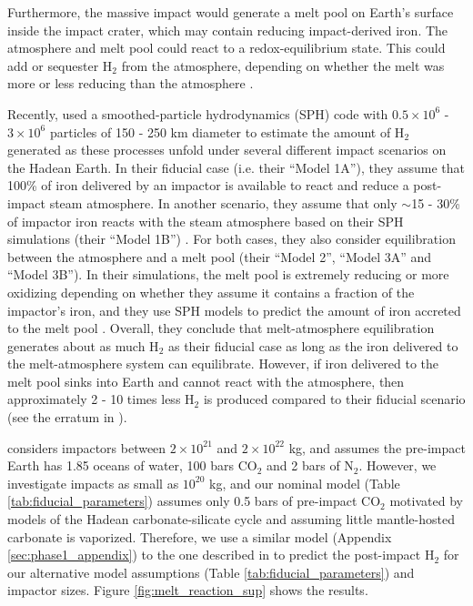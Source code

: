 Furthermore, the massive impact would generate a melt pool on Earth's surface inside the impact crater, which may contain reducing impact-derived iron. The atmosphere and melt pool could react to a redox-equilibrium state. This could add or sequester H$_2$ from the atmosphere, depending on whether the melt was more or less reducing than the atmosphere \citep{Itcovitz_2022}.

Recently, \citet{Itcovitz_2022} used a smoothed-particle hydrodynamics (SPH) code with $0.5 \times 10^6$ - $3 \times 10^6$ particles of 150 - 250 km diameter to estimate the amount of H$_2$ generated as these processes unfold under several different impact scenarios on the Hadean Earth. In their fiducial case (i.e. their ``Model 1A''), they assume that 100\% of iron delivered by an impactor is available to react and reduce a post-impact steam atmosphere. In another scenario, they assume that only $\sim$15 - 30\% of impactor iron reacts with the steam atmosphere based on their SPH simulations (their ``Model 1B'') \citep{Citron_2022}. For both cases, they also consider equilibration between the atmosphere and a melt pool (their ``Model 2'', ``Model 3A'' and ``Model 3B''). In their simulations, the melt pool is extremely reducing or more oxidizing depending on whether they assume it contains a fraction of the impactor's iron, and they use SPH models to predict the amount of iron accreted to the melt pool \citep{Citron_2022}. Overall, they conclude that melt-atmosphere equilibration generates about as much H$_2$ as their fiducial case as long as the iron delivered to the melt-atmosphere system can equilibrate. However, if iron delivered to the melt pool sinks into Earth and cannot react with the atmosphere, then approximately 2 - 10 times less H$_2$ is produced compared to their fiducial scenario (see the erratum in \citet{Itcovitz_2022}).

\citet{Itcovitz_2022} considers impactors between $2 \times 10^{21}$ and $2 \times 10^{22}$ kg, and assumes the pre-impact Earth has 1.85 oceans of water, 100 bars CO$_2$ and 2 bars of N$_2$. However, we investigate impacts as small as $10^{20}$ kg, and our nominal model (Table \ref{tab:fiducial_parameters}) assumes only 0.5 bars of pre-impact CO$_2$ motivated by models of the Hadean carbonate-silicate cycle \citep{Kadoya_2020} and assuming little mantle-hosted carbonate is vaporized. Therefore, we use a similar model (Appendix \ref{sec:phase1_appendix}) to the one described in \citet{Itcovitz_2022} to predict the post-impact H$_2$ for our alternative model assumptions (Table \ref{tab:fiducial_parameters}) and impactor sizes. Figure \ref{fig:melt_reaction_sup} shows the results.

